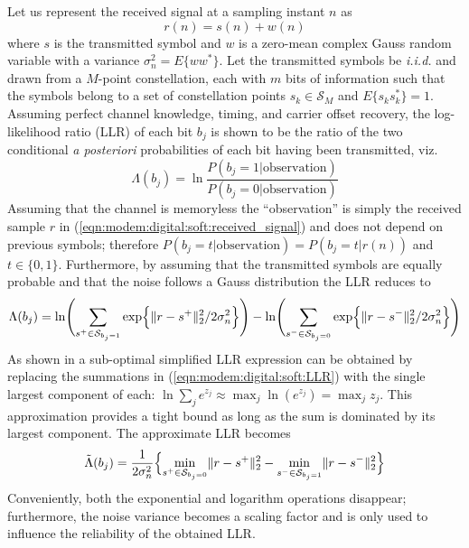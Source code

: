 %
Let us represent the received signal at a sampling instant $n$ as
%
\begin{equation}
\label{eqn:modem:digital:soft:received_signal}
    r(n) = s(n) + w(n)
\end{equation}
%
where $s$ is the transmitted symbol
and $w$ is a zero-mean complex Gauss random variable with
a variance $\sigma_n^2 = E\{w w^*\}$.
Let the transmitted symbols be {\em i.i.d.} and drawn from a $M$-point
constellation, each with $m$ bits of information
such that the symbols belong to a set of constellation points
$s_k \in \mathcal{S}_M$ and $E\{s_k s_k^*\}=1$.
%
Assuming perfect channel knowledge, timing, and carrier offset recovery,
the log-likelihood ratio (LLR) of each bit $b_j$ is shown to be
\cite[Eq.~(8)]{LeGoff:1994}
the ratio of the two conditional {\em a posteriori} probabilities of
each bit having been transmitted, viz.
%
\begin{equation}
\label{eqn:modem:digital:soft:LLR_true}
    \Lambda(b_j) =
        \ln \frac{
            P\left(b_j=1 | \text{observation} \right)
        }{
            P\left(b_j=0 | \text{observation} \right)
        }
\end{equation}
%
Assuming that the channel is memoryless the ``observation'' is simply
the received sample $r$ in
(\ref{eqn:modem:digital:soft:received_signal})
and does not depend on previous symbols; therefore
$P\left(b_j=t|\text{observation}\right) = P\left(b_j=t|r(n)\right)$
and $t \in \{0,1\}$.
Furthermore, by assuming that the transmitted symbols are equally
probable and that the noise follows a Gauss distribution
\cite{Qiang:2003}
the LLR reduces to
%
\begin{equation}
\label{eqn:modem:digital:soft:LLR}
    \Lambda(b_j) =
        \ln \Biggl(
            \sum_{s^+\in \mathcal{S}_{b_j=1}} { \exp\Bigl\{\|r-s^+\|_2^2 / 2 \sigma_n^2\Bigr\} }
        \Biggr)
       -\ln \Biggl(
            \sum_{s^-\in \mathcal{S}_{b_j=0}} { \exp\Bigl\{\|r-s^-\|_2^2 / 2 \sigma_n^2\Bigr\} }
        \Biggr)
\end{equation}
%
As shown in \cite{Qiang:2003} a sub-optimal simplified LLR expression
can be obtained by replacing the summations in
(\ref{eqn:modem:digital:soft:LLR}) with the single largest component of
each: $\ln \sum_j {e^{z_j}} \approx \max_j \ln (e^{z_j}) = \max_j z_j$.
This approximation provides a tight bound as long as the sum is
dominated by its largest component.
The approximate LLR becomes
%
\begin{equation}
\label{eqn:modem:digital:soft:LLR_approx}
    \tilde{\Lambda}(b_j) =
        \frac{1}{2\sigma_n^2}
        \Bigl\{
            \underset{s^+\in \mathcal{S}_{b_j=0}}{\min} \|r-s^+\|_2^2 -
            \underset{s^-\in \mathcal{S}_{b_j=1}}{\min} \|r-s^-\|_2^2
        \Bigr\}
\end{equation}
%
Conveniently, both the exponential and logarithm operations disappear;
furthermore, the noise variance becomes a scaling factor and is only
used to influence the reliability of the obtained LLR.

